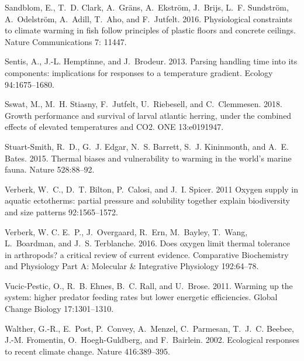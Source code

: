\documentclass[11pt]{article}\usepackage[]{graphicx}\usepackage[]{color,soul}
\begin{document}
\begin{thebibliography}{62}
Sandblom, E., T.~D. Clark, A.~Gräns,  A.~Ekström, J.~Brijs, L.~F. Sundström, A.~Odelström, A.~Adill, T.~Aho, and F.~Jutfelt. 2016.
\newblock Physiological constraints to climate warming in fish follow principles of plastic floors and concrete ceilings. 
\newblock Nature Communications 7: 11447.


Sentis, A., J.-L. Hemptinne, and J.~Brodeur. 2013.
\newblock Parsing handling time into its components: implications for responses
  to a temperature gradient.
\newblock Ecology 94:1675--1680.

Sswat, M., M.~H. Stiasny, F.~Jutfelt, U.~Riebesell, and C.~Clemmesen.
  2018.
\newblock Growth performance and survival of larval atlantic herring, under the
  combined effects of elevated temperatures and {CO}2.
 {ONE} 13:e0191947.

Stuart-Smith, R.~D., G.~J. Edgar, N.~S. Barrett, S.~J. Kininmonth, and A.~E.
  Bates. 2015.
\newblock Thermal biases and vulnerability to warming in the world’s marine
  fauna.
\newblock Nature 528:88--92.

Verberk, W.~C., D.~T. Bilton, P.~Calosi, and J.~I. Spicer. 2011
\newblock Oxygen supply in aquatic ectotherms: partial pressure and solubility
  together explain biodiversity and size patterns 92:1565--1572.

Verberk, W. C. E.~P., J.~Overgaard, R.~Ern, M.~Bayley, T.~Wang, L.~Boardman,
  and J.~S. Terblanche. 2016.
\newblock Does oxygen limit thermal tolerance in arthropods? a critical review
  of current evidence.
\newblock Comparative Biochemistry and Physiology Part A: Molecular \&
  Integrative Physiology 192:64--78.

Vucic-Pestic, O., R.~B. Ehnes, B.~C. Rall, and U.~Brose. 2011.
\newblock Warming up the system: higher predator feeding rates but lower
  energetic efficiencies.
\newblock Global Change Biology 17:1301--1310.

Walther, G.-R., E.~Post, P.~Convey, A.~Menzel, C.~Parmesan, T.~J.~C. Beebee,
  J.-M. Fromentin, O.~Hoegh-Guldberg, and F.~Bairlein. 2002.
\newblock Ecological responses to recent climate change.
\newblock Nature 416:389--395.

\end{thebibliography}
\end{document}
